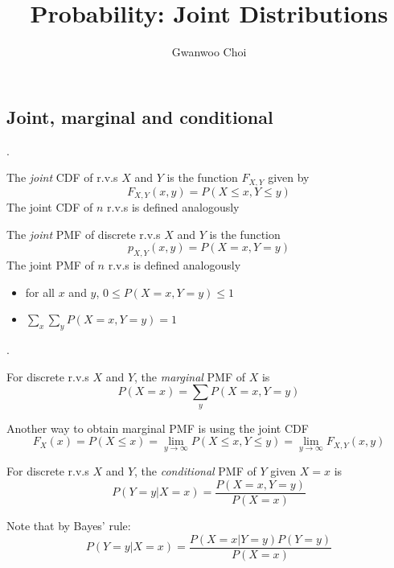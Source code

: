 \documentclass[8pt]{beamer}
\title{Probability: Joint Distributions}
\author{Gwanwoo Choi}
\newcommand{\ti}[1]{\textit{#1}}
\begin{document}
\begin{frame}
    \titlepage
\end{frame}


\subsection{Joint, marginal and conditional}

\begin{frame}{.}
    \begin{definition}
        The \ti{joint} CDF of r.v.s $X$ and $Y$ is the function $F_{X,Y}$ given by
        \[
            F_{X,Y} (x,y) = P(X\leq x, Y \leq y)
        \]
        The joint CDF of $n$ r.v.s is defined analogously
    \end{definition}

    \begin{definition}
        The \ti{joint} PMF of discrete r.v.s $X$ and $Y$ is the function 
        \[p_{X,Y}(x,y) = P(X=x,Y=y)\]
        The joint PMF of $n$ r.v.s is defined analogously
    \end{definition}

    \begin{itemize}
        \item for all $x$ and $y$,  $0 \leq P(X=x,Y=y) \leq 1$
        \item $\sum_x \sum_y P(X=x,Y=y) = 1$
    \end{itemize}
\end{frame}

\begin{frame}{.}
    \begin{definition}
        For discrete r.v.s $X$ and $Y$, the \ti{marginal} PMF of $X$ is 
        \[
            P(X=x) = \sum_y P(X=x,Y=y)
        \]
    \end{definition}
    Another way to obtain marginal PMF is using the joint CDF
    \[
        F_X(x) = P(X \leq x) = \lim_{y \rightarrow \infty} P(X\leq x, Y\leq y) = \lim_{y \rightarrow \infty} F_{X,Y} (x,y)
    \]

    \begin{definition}
        For discrete r.v.s $X$ and $Y$, the \ti{conditional} PMF of $Y$ given $X = x$ is 
        \[
        P(Y=y |X=x) = \frac{P(X=x,Y=y)}{P(X=x)}
        \]
    \end{definition}

    Note that by Bayes' rule:
    \[
    P(Y=y|X=x) = \frac{P(X=x|Y=y) P(Y=y)}{P(X=x)}
    \]
\end{frame}
\end{document}
